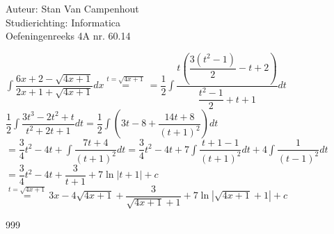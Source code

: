 \documentclass[a4paper]{article}
\begin{document}
  
\noindent \large Auteur: Stan Van Campenhout \\
\noindent \large Studierichting:  Informatica\\
\noindent \large Oefeningenreeks 4A nr. 60.14\\

\medskip

\normalsize

$ \displaystyle\int\dfrac{6x+2-\sqrt{4x+1}}{2x+1+\sqrt{4x+1}}dx 
\stackrel{t = \sqrt{4x+1}}{=} = \dfrac{1}{2}\displaystyle\int\dfrac{t\left(\dfrac{3\left(t^2-1\right)}{2}-t+2\right)}{\dfrac{t^2-1}{2}+t+1}dt $\\

$ \dfrac{1}{2}\displaystyle\int\dfrac{3t^3-2t^2+t}{t^2+2t+1}dt = \dfrac{1}{2}\displaystyle\int\left(3t-8+\dfrac{14t+8}{\left(t+1\right)^2}\right)dt $\\

$ = \dfrac{3}{4}t^2-4t+\displaystyle\int\dfrac{7t+4}{\left(t+1\right)^2}dt
= \dfrac{3}{4}t^2-4t+7\displaystyle\int\dfrac{t+1-1}{\left(t+1\right)^2}dt + 4\displaystyle\int\dfrac{1}{\left(t-1\right)^2}dt $\\

$ = \dfrac{3}{4}t^2-4t + \dfrac{3}{t+1} + 7\ln|t+1| + c $\\

$ \stackrel{t = \sqrt{4x+1}}{=} 3x-4\sqrt{4x+1}+\dfrac{3}{\sqrt{4x+1}+1} + 7\ln\left|\sqrt{4x+1}+1\right| + c $\\

\begin{thebibliography}{999}
\end{thebibliography}
\end{document}
